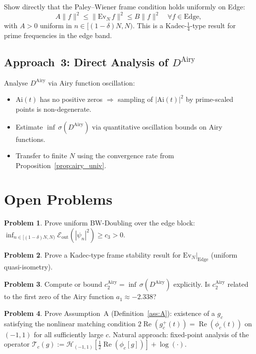 \documentclass[12pt,a4paper]{amsart}
\theoremstyle{definition}
\newtheorem{problem}{Problem}[section]
\newcommand{\Ev}{\mathrm{Ev}_N}
\newcommand{\Eout}{\mathcal{E}_{\mathrm{out}}}
\begin{document}
Show directly that the Paley--Wiener frame condition holds
uniformly on Edge:
\[
  A\|f\|^2 \le \|\Ev\,f\|^2 \le B\|f\|^2
  \quad \forall f \in \mathrm{Edge},
\]
with $A > 0$ uniform in $n \in [(1-\delta)N, N)$.
This is a Kadec-$\tfrac{1}{4}$-type result for prime frequencies
in the edge band.

\subsection{Approach~3: Direct Analysis of $D^{\mathrm{Airy}}$}

Analyse $D^{\mathrm{Airy}}$ via Airy function oscillation:
\begin{itemize}
  \item $\mathrm{Ai}(t)$ has no positive zeros
  $\Rightarrow$ sampling of $|\mathrm{Ai}(t)|^2$
  by prime-scaled points is non-degenerate.
  \item Estimate $\inf\,\sigma(D^{\mathrm{Airy}})$
  via quantitative oscillation bounds on Airy functions.
  \item Transfer to finite $N$ using the convergence rate
  from Proposition~\ref{prop:airy_univ}.
\end{itemize}

\section{Open Problems}\label{sec:open}

\begin{problem}\label{prob:bwdoubling_uniform}
Prove uniform BW-Doubling over the edge block:
$\inf_{n \in [(1-\delta)N,N)} \Eout(|\psi_n|^2) \ge c_3 > 0$.
\end{problem}

\begin{problem}\label{prob:kadec_edge}
Prove a Kadec-type frame stability result for
$\Ev|_{\mathrm{Edge}}$ (uniform quasi-isometry).
\end{problem}

\begin{problem}\label{prob:airy_gap_compute}
Compute or bound
$c_2^{\mathrm{Airy}} = \inf\,\sigma(D^{\mathrm{Airy}})$
explicitly.
Is $c_2^{\mathrm{Airy}}$ related to the
first zero of the Airy function $a_1 \approx -2.338$?
\end{problem}

\begin{problem}\label{prob:g_existence}
Prove Assumption~A (Definition~\ref{ass:A}): existence of a
$g_c$ satisfying the nonlinear matching condition
$2\operatorname{Re}(g_c^+(t)) = \operatorname{Re}(\phi_c(t))$
on $(-1,1)$ for all sufficiently large $c$.
Natural approach: fixed-point analysis of the operator
$\mathcal{T}_c(g) := \mathcal{H}_{(-1,1)}
[\tfrac{1}{2}\operatorname{Re}(\phi_c[g])] + \log(\cdot)$.
\end{problem}
\end{document}
